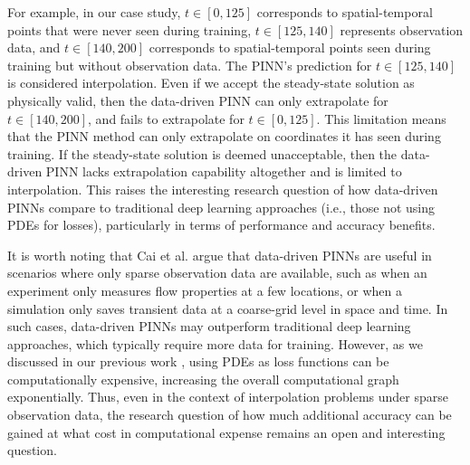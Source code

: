 For example, in our case study, $t \in [0, 125]$ corresponds to spatial-temporal points that were never seen during training, $t \in [125, 140]$ represents observation data, and $t \in [140, 200]$ corresponds to spatial-temporal points seen during training but without observation data.
The PINN's prediction for $t \in [125, 140]$ is considered interpolation.
Even if we accept the steady-state solution as physically valid, then the data-driven PINN can only extrapolate for $t \in [140, 200]$, and fails to extrapolate for $t \in [0, 125]$.
This limitation means that the PINN method can only extrapolate on coordinates it has seen during training.
If the steady-state solution is deemed unacceptable, then the data-driven PINN lacks extrapolation capability altogether and is limited to interpolation.
This raises the interesting research question of how data-driven PINNs compare to traditional deep learning approaches (i.e., those not using PDEs for losses), particularly in terms of performance and accuracy benefits.

It is worth noting that Cai et al. \cite{cai_physics-informed_2021} argue that data-driven PINNs are useful in scenarios where only sparse observation data are available, such as when an experiment only measures flow properties at a few locations, or when a simulation only saves transient data at a coarse-grid level in space and time.
In such cases, data-driven PINNs may outperform traditional deep learning approaches, which typically require more data for training.
However, as we discussed in our previous work \cite{chuang_experience_2022}, using PDEs as loss functions can be computationally expensive, increasing the overall computational graph exponentially.
Thus, even in the context of interpolation problems under sparse observation data, the research question of how much additional accuracy can be gained at what cost in computational expense remains an open and interesting question.

